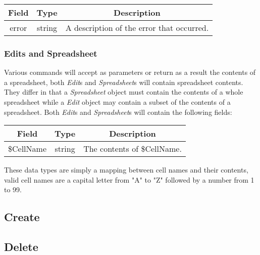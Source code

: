 \begin{table}[h!]
    \begin{center}
        \begin{tabular}{|c|c|c|}\hline
            Field & Type & Description \\\hline
            error & string & A description of the error that occurred. \\\hline
        \end{tabular}
    \end{center}
\end{table}

\subsubsection{Edits and Spreadsheet}
\label{sec:message:edits}
\label{sec:message:spreadsheet}

Various commands will accept as parameters or return as a result the contents of a spreadsheet,
both \emph{Edit}s and \emph{Spreadsheet}s will contain spreadsheet contents. They differ in that
a \emph{Spreadsheet} object must contain the contents of a whole spreadsheet while a \emph{Edit}
object may contain a subset of the contents of a spreadsheet. Both \emph{Edit}s and \emph{Spreadsheet}s
will contain the following fields:

\begin{table}[h!]
    \begin{center}
        \begin{tabular}{|c|c|c|}\hline
            Field & Type & Description \\\hline
            \$CellName & string & The contents of \$CellName. \\\hline
        \end{tabular}
    \end{center}
\end{table}

These data types are simply a mapping between cell names and their contents, valid cell names are a
capital letter from "A" to "Z" followed by a number from 1 to 99.

\subsection{Create}
\label{sec:message:create}


\subsection{Delete}
\label{sec:message:delete}


